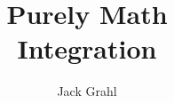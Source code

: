 \documentclass{book}
\title{Purely Math \\ Integration}
\author{Jack Grahl}
\begin{document}
\frontmatter
\maketitle



\mainmatter



\backmatter
\printglossaries
\printindex
\end{document}

